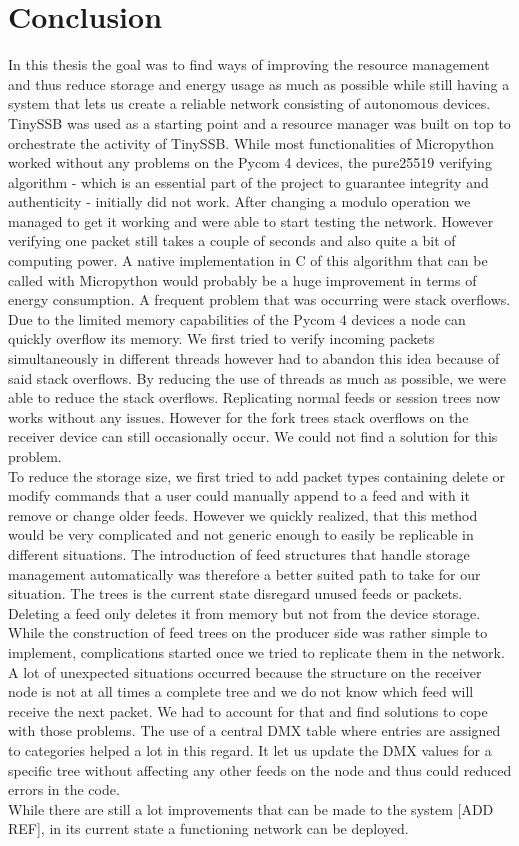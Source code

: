\chapter{Conclusion}
In this thesis the goal was to find ways of improving the resource management and thus reduce storage and energy usage as much as possible while still having a system that lets us create a reliable network consisting of autonomous devices. TinySSB was used as a starting point and a resource manager was built on top to orchestrate the activity of TinySSB. While most functionalities of Micropython worked without any problems on the Pycom 4 devices, the pure25519 verifying algorithm - which is an essential part of the project to guarantee integrity and authenticity - initially did not work. After changing a modulo operation we managed to get it working and were able to start testing the network. However verifying one packet still takes a couple of seconds and also quite a bit of computing power. A native implementation in C of this algorithm that can be called with Micropython would probably be a huge improvement in terms of energy consumption. A frequent problem that was occurring were stack overflows. Due to the limited memory capabilities of the Pycom 4 devices a node can quickly overflow its memory. We first tried to verify incoming packets simultaneously in different threads however had to abandon this idea because of said stack overflows. By reducing the use of threads as much as possible, we were able to reduce the stack overflows. Replicating normal feeds or session trees now works without any issues. However for the fork trees stack overflows on the receiver device can still occasionally occur. We could not find a solution for this problem. \\
To reduce the storage size, we first tried to add packet types containing delete or modify commands that a user could manually append to a feed and with it remove or change older feeds. However we quickly realized, that this method would be very complicated and not generic enough to easily be replicable in different situations. The introduction of feed structures that handle storage management automatically was therefore a better suited path to take for our situation. The trees is the current state disregard unused feeds or packets. Deleting a feed only deletes it from memory but not from the device storage. While the construction of feed trees on the producer side was rather simple to implement, complications started once we tried to replicate them in the network. A lot of unexpected situations occurred because the structure on the receiver node is not at all times a complete tree and we do not know which feed will receive the next packet. We had to account for that and find solutions to cope with those problems. The use of a central DMX table where entries are assigned to categories helped a lot in this regard. It let us update the DMX values for a specific tree without affecting any other feeds on the node and thus could reduced errors in the code. \\
While there are still a lot improvements that can be made to the system [ADD REF], in its current state a functioning network can be deployed.

